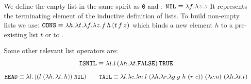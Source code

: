 \begin{definition}
  We define the empty list in the same spirit as \texttt{0} and \FALSE:
  \(
    \texttt{NIL} \equiv \lambda f.\lambda z. z
  \)
  It represents the terminating element of the inductive definition of lists. To build non-empty lists we use:
  \(
    \texttt{CONS} \equiv \lambda h.\lambda t.\lambda f.\lambda z. f\,h\,(t\,f\,z)
  \)
  which binds a new element $h$ to a pre-existing list $t$ or to \NIL.
\end{definition}
\begin{definition}
  Some other relevant list operators are:
  \[
    \texttt{ISNIL} \equiv \lambda l. l\,(\lambda h.\lambda t. \texttt{FALSE})\,\texttt{TRUE}
  \]
  \[
    \texttt{HEAD} \equiv \la l.\,((l \; (\la h.\, \la t.\, h))\; \texttt{NIL}) \qquad
    \texttt{TAIL} \equiv \la l.\la c.\la n.l\ (\la h.\la r.\la g.g\ h\ (r\ c))\ (\la c.n)\ (\la h.\la t.t)
  \]
\end{definition}



